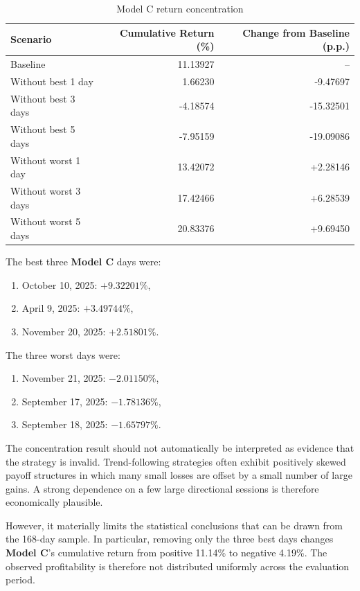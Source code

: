 \documentclass{article}
\begin{document}

\begin{table}[H]
\centering
\caption{Model C return concentration}
\label{tab:concentration}
\begin{tabular}{lrr}
\toprule
Scenario & Cumulative Return (\%) & Change from Baseline (p.p.) \\
\midrule
Baseline                         & 11.13927 & -- \\
Without best 1 day               & 1.66230  & -9.47697 \\
Without best 3 days              & -4.18574 & -15.32501 \\
Without best 5 days              & -7.95159 & -19.09086 \\
Without worst 1 day              & 13.42072 & +2.28146 \\
Without worst 3 days             & 17.42466 & +6.28539 \\
Without worst 5 days             & 20.83376 & +9.69450 \\
\bottomrule
\end{tabular}
\end{table}

The best three\textbf{ Model C} days were:
\begin{enumerate}
    \item October 10, 2025: $+9.32201\%$,
    \item April 9, 2025: $+3.49744\%$,
    \item November 20, 2025: $+2.51801\%$.
\end{enumerate}

The three worst days were:
\begin{enumerate}
    \item November 21, 2025: $-2.01150\%$,
    \item September 17, 2025: $-1.78136\%$,
    \item September 18, 2025: $-1.65797\%$.
\end{enumerate}

The concentration result should not automatically be interpreted as evidence that the strategy is invalid. Trend-following strategies often exhibit positively skewed payoff structures in which many small losses are offset by a small number of large gains. A strong dependence on a few large directional sessions is therefore economically plausible.

However, it materially limits the statistical conclusions that can be drawn from the 168-day sample. In particular, removing only the three best days changes\textbf{ Model C}'s cumulative return from positive 11.14\% to negative 4.19\%. The observed profitability is therefore not distributed uniformly across the evaluation period.
\end{document}
